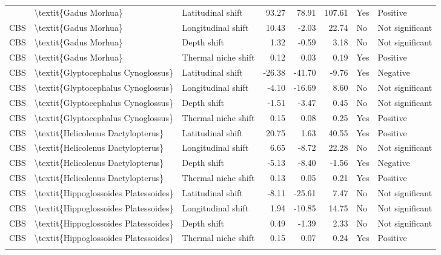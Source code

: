 \begin{longtable}[t]{lllrrrll}
{{CBS & \textbackslash{}textit\{Gadus Morhua\} & Latitudinal shift & 93.27 & 78.91 & 107.61 & Yes & Positive\\
CBS & \textbackslash{}textit\{Gadus Morhua\} & Longitudinal shift & 10.43 & -2.03 & 22.74 & No & Not significant\\
CBS & \textbackslash{}textit\{Gadus Morhua\} & Depth shift & 1.32 & -0.59 & 3.18 & No & Not significant\\
CBS & \textbackslash{}textit\{Gadus Morhua\} & Thermal niche shift & 0.12 & 0.03 & 0.19 & Yes & Positive\\
\addlinespace
CBS & \textbackslash{}textit\{Glyptocephalus Cynoglossus\} & Latitudinal shift & -26.38 & -41.70 & -9.76 & Yes & Negative\\
CBS & \textbackslash{}textit\{Glyptocephalus Cynoglossus\} & Longitudinal shift & -4.10 & -16.69 & 8.60 & No & Not significant\\
CBS & \textbackslash{}textit\{Glyptocephalus Cynoglossus\} & Depth shift & -1.51 & -3.47 & 0.45 & No & Not significant\\
CBS & \textbackslash{}textit\{Glyptocephalus Cynoglossus\} & Thermal niche shift & 0.15 & 0.08 & 0.25 & Yes & Positive\\
CBS & \textbackslash{}textit\{Helicolenus Dactylopterus\} & Latitudinal shift & 20.75 & 1.63 & 40.55 & Yes & Positive\\
\addlinespace
CBS & \textbackslash{}textit\{Helicolenus Dactylopterus\} & Longitudinal shift & 6.65 & -8.72 & 22.28 & No & Not significant\\
CBS & \textbackslash{}textit\{Helicolenus Dactylopterus\} & Depth shift & -5.13 & -8.40 & -1.56 & Yes & Negative\\
CBS & \textbackslash{}textit\{Helicolenus Dactylopterus\} & Thermal niche shift & 0.13 & 0.05 & 0.21 & Yes & Positive\\
CBS & \textbackslash{}textit\{Hippoglossoides Platessoides\} & Latitudinal shift & -8.11 & -25.61 & 7.47 & No & Not significant\\
CBS & \textbackslash{}textit\{Hippoglossoides Platessoides\} & Longitudinal shift & 1.94 & -10.85 & 14.75 & No & Not significant\\
\addlinespace
CBS & \textbackslash{}textit\{Hippoglossoides Platessoides\} & Depth shift & 0.49 & -1.39 & 2.33 & No & Not significant\\
CBS & \textbackslash{}textit\{Hippoglossoides Platessoides\} & Thermal niche shift & 0.15 & 0.07 & 0.24 & Yes & Positive\\
}}
\end{longtable}
